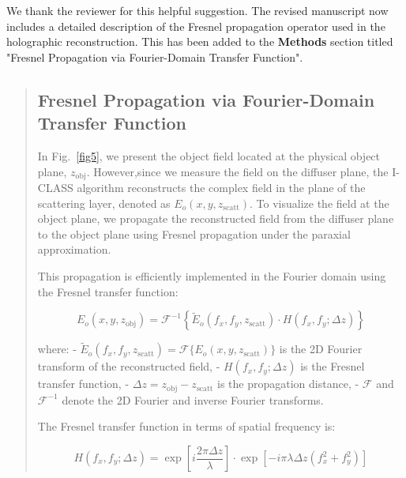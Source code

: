 \documentclass[12pt]{article}
\newcommand{\hlred}[1]{\sethlcolor{red!30}\hl{#1}}
\newenvironment{ourresponse}
    {\begin{tcolorbox}[width=\linewidth,breakable,enhanced,colback=gray!5,colframe=responsecolor!50,title=Response,left=5pt,right=5pt]}
    {\end{tcolorbox}}
\begin{document}
\begin{enumerate}[label=\arabic*.]
    

    \begin{ourresponse}
        We thank the reviewer for this helpful suggestion. The revised manuscript now includes a detailed description of the Fresnel propagation operator used in the holographic reconstruction. This has been added to the \textbf{Methods} section titled "Fresnel Propagation via Fourier-Domain Transfer Function".
        \begin{quote}
            \subsection*{Fresnel Propagation via Fourier-Domain Transfer Function}
            \label{Fresnel_propagation}
            In Fig.~\ref{fig5}, we present the object field located at the physical object plane, $z_{\text{obj}}$. However,since we measure the field on the diffuser plane, the I-CLASS algorithm reconstructs the complex field in the plane of the scattering layer, denoted as $E_o(x, y, z_{\text{scatt}})$. To visualize the field at the object plane, we propagate the reconstructed field from the diffuser plane to the object plane using Fresnel propagation under the paraxial approximation.
            
            This propagation is efficiently implemented in the Fourier domain using the Fresnel transfer function:
            
            \begin{equation}
                E_o(x, y, z_{\text{obj}}) = \mathcal{F}^{-1} \left\{ \tilde{E}_o(f_x, f_y, z_{\text{scatt}}) \cdot H(f_x, f_y; \Delta z) \right\}
            \end{equation}
            
            where:
            - $ \tilde{E}_o(f_x, f_y, z_{\text{scatt}}) = \mathcal{F}\{ E_o(x, y, z_{\text{scatt}}) \} $ is the 2D Fourier transform of the reconstructed field,
            - $ H(f_x, f_y; \Delta z) $ is the Fresnel transfer function,
            - $ \Delta z = z_{\text{obj}} - z_{\text{scatt}} $ is the propagation distance,
            - $ \mathcal{F} $ and $ \mathcal{F}^{-1} $ denote the 2D Fourier and inverse Fourier transforms.
            
            The Fresnel transfer function in terms of spatial frequency is:
            
            \begin{equation}
                H(f_x, f_y; \Delta z) = \exp\left[ i \frac{2\pi \Delta z}{\lambda} \right] \cdot \exp\left[ -i \pi \lambda \Delta z (f_x^2 + f_y^2) \right]
            \end{equation}
            

\end{quote}
\end{ourresponse}
\end{enumerate}
\end{document}
